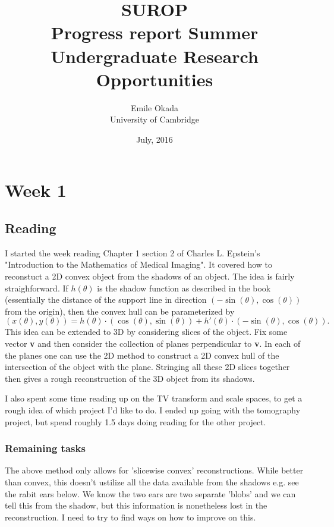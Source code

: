 \documentclass[a4paper]{article}
\begin{document}
\title{
    SUROP \\ Progress report
}
\title{Summer Undergraduate Research Opportunities}
\date{July, 2016}
\author{Emile Okada \\ University of Cambridge}
\maketitle

\newpage

\setcounter{section}{0}
\section{Week 1}
\subsection{Reading}
I started the week reading Chapter 1 section 2 of Charles L. Epstein's "Introduction to the Mathematics of Medical Imaging".
It covered how to reconstuct a 2D convex object from the shadows of an object. 
The idea is fairly straighforward. 
If $h(\theta)$ is the shadow function as described in the book (essentially the distance of the support line in direction $(-\sin(\theta),\cos(\theta))$ from the origin), then the convex hull can be parameterized by
\begin{equation}
    (x(\theta),y(\theta)) = h(\theta)\cdot(\cos(\theta),\sin(\theta))+h'(\theta)\cdot(-\sin(\theta),\cos(\theta)).
\end{equation}
This idea can be extended to 3D by considering slices of the object. 
Fix some vector {\bfseries v} and then consider the collection of planes perpendicular to {\bfseries v}. 
In each of the planes one can use the 2D method to construct a 2D convex hull of the intersection of the object with the plane. 
Stringing all these 2D slices together then gives a rough reconstruction of the 3D object from its shadows.

I also spent some time reading up on the TV transform and scale spaces, to get a rough idea of which project I'd like to do. 
I ended up going with the tomography project, but spend roughly 1.5 days doing reading for the other project.
\subsubsection{Remaining tasks}
The above method only allows for 'slicewise convex' reconstructions. While better than convex, this doesn't ustilize all the data available from the shadows e.g. see the rabit ears below. We know the two ears are two separate 'blobs' and we can tell this from the shadow, but this information is nonetheless lost in the reconstruction. I need to try to find ways on how to improve on this.
\end{document}
